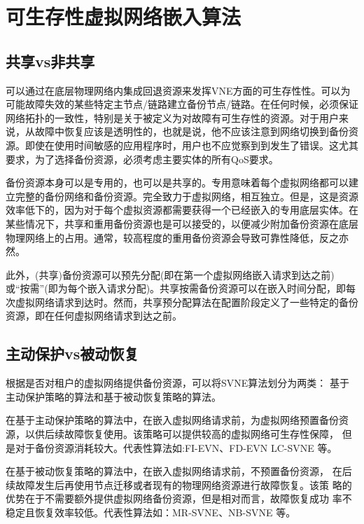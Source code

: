 \section{可生存性虚拟网络嵌入算法}
\subsection{共享vs非共享}
可以通过在底层物理网络内集成回退资源来发挥VNE方面的可生存性性。可以为可能故障失效的某些特定主节点/链路建立备份节点/链路。在任何时候，必须保证网络拓扑的一致性，特别是关于被定义为对故障有可生存性的资源。对于用户来说，从故障中恢复应该是透明性的，也就是说，他不应该注意到网络切换到备份资源。即使在使用时间敏感的应用程序时，用户也不应觉察到到发生了错误。这尤其要求，为了选择备份资源，必须考虑主要实体的所有QoS要求。

备份资源本身可以是专用的，也可以是共享的\cite{guo2011shared}。专用意味着每个虚拟网络都可以建立完整的备份网络和备份资源。完全致力于虚拟网络，相互独立。但是，这是资源效率低下的，因为对于每个虚拟资源都需要获得一个已经嵌入的专用底层实体。在某些情况下，共享和重用备份资源也是可以接受的，以便减少附加备份资源在底层物理网络上的占用。通常，较高程度的重用备份资源会导致可靠性降低，反之亦然。

此外，(共享)备份资源可以预先分配(即在第一个虚拟网络嵌入请求到达之前)或“按需”(即为每个嵌入请求分配)。共享按需备份资源可以在嵌入时间分配，即每次虚拟网络请求到达\cite{guo2011shared,yeow2010designing,yu2011cost}时。然而，共享预分配算法在配置阶段定义了一些特定的备份资源，即在任何虚拟网络请求到达之前\cite{rahman2010survivable}。
\subsection{主动保护vs被动恢复}
根据是否对租户的虚拟网络提供备份资源，可以将SVNE算法划分为两类： 基于主动保护策略的算法和基于被动恢复策略的算法\cite{herker2013survey}。

在基于主动保护策略的算法中，在嵌入虚拟网络请求前，为虚拟网络预置备份资源，以供后续故障恢复使用。该策略可以提供较高的虚拟网络可生存性保障， 但是对于备份资源消耗较大。代表性算法如:FI-EVN\cite{yu2011cost}、FD-EVN\cite{wang2014survivable} LC-SVNE\cite{hu2012location} 等。

在基于被动恢复策略的算法中，在嵌入虚拟网络请求前，不预置备份资源， 在后续故障发生后再使用节点迁移或者现有的物理网络资源进行故障恢复。该策 略的优势在于不需要额外提供虚拟网络备份资源，但是相对而言，故障恢复成功 率不稳定且恢复效率较低。代表性算法如：MR-SVNE\cite{qiang2014heuristic}、NB-SVNE\cite{bo2014dynamic} 等。

